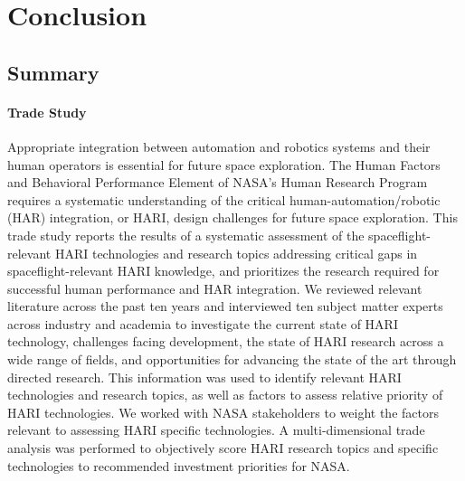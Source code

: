 \chapter{Conclusion}
\label{chap:conclusion}

\section{Summary}

\subsubsection{Trade Study}
Appropriate integration between automation and robotics systems and their human operators is essential for future space exploration.
The Human Factors and Behavioral Performance Element of NASA's Human Research Program requires a systematic understanding of the critical human-automation/robotic (HAR) integration, or HARI, design challenges for future space exploration.
This trade study reports the results of a systematic assessment of the spaceflight-relevant HARI technologies and research topics addressing critical gaps in spaceflight-relevant HARI knowledge, and prioritizes the research required for successful human performance and HAR integration.
We reviewed relevant literature across the past ten years and interviewed ten subject matter experts across industry and academia to investigate the current state of HARI technology, challenges facing development, the state of HARI research across a wide range of fields, and opportunities for advancing the state of the art through directed research.
This information was used to identify relevant HARI technologies and research topics, as well as factors to assess relative priority of HARI technologies.
We worked with NASA stakeholders to weight the factors relevant to assessing HARI specific technologies.
A multi-dimensional trade analysis was performed to objectively score HARI research topics and specific technologies to recommended investment priorities for NASA.

